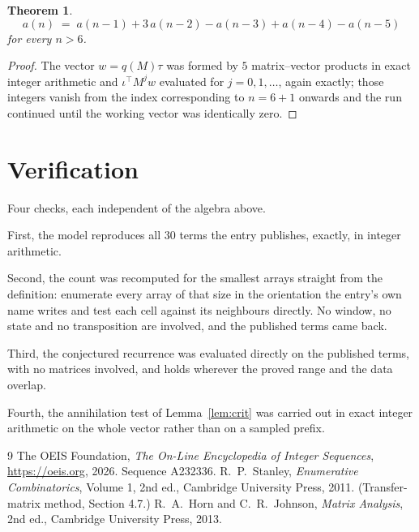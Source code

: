 \documentclass[11pt,a4paper]{article}
\theoremstyle{plain}
\newtheorem{theorem}{Theorem}
\theoremstyle{definition}
\begin{document}
\begin{theorem}
\[
a(n)\;=\;a(n-1) + 3\,a(n-2) - a(n-3) + a(n-4) - a(n-5)
\]
for every $n>6$.
\end{theorem}

\begin{proof}
The vector $w=q(M)\tau$ was formed by $5$ matrix--vector products in exact integer
arithmetic and $\iota^{\!\top}M^{j}w$ evaluated for $j=0,1,\dots$, again exactly; those
integers vanish from the index corresponding to $n=6+1$ onwards and the run continued
until the working vector was identically zero.
\end{proof}

\section{Verification}

Four checks, each independent of the algebra above.

First, the model reproduces all $30$ terms the entry publishes, exactly, in integer
arithmetic.

Second, the count was recomputed for the smallest arrays straight from the definition:
enumerate every array of that size in the orientation the entry's own name writes and test each
cell against its neighbours directly. No window, no state and no transposition are involved,
and the published terms came back.

Third, the conjectured recurrence was evaluated directly on the published terms, with no
matrices involved, and holds wherever the proved range and the data overlap.

Fourth, the annihilation test of Lemma~\ref{lem:crit} was carried out in exact integer
arithmetic on the whole vector rather than on a sampled prefix.

\begin{thebibliography}{9}
 The OEIS Foundation, \emph{The On-Line Encyclopedia of Integer
Sequences}, \url{https://oeis.org}, 2026. Sequence A232336.
 R.~P.~Stanley, \emph{Enumerative Combinatorics}, Volume 1, 2nd ed.,
Cambridge University Press, 2011. (Transfer-matrix method, Section 4.7.)
 R.~A.~Horn and C.~R.~Johnson, \emph{Matrix Analysis}, 2nd ed., Cambridge
University Press, 2013.
\end{thebibliography}
\end{document}
